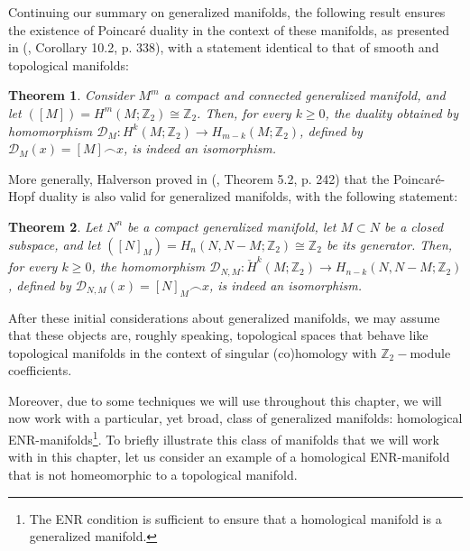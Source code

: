\documentclass[12pt,oneside]{book}
\newtheorem{teo}    {Theorem}[chapter]
\newcommand{\Z}{\mathbb{Z}}
\newcommand{\ccap}{\frown}
\begin{document}
    Continuing our summary on generalized manifolds, the following result ensures the existence of Poincaré duality in the context of these 
    manifolds, as presented in (\cite{bredon_2}, Corollary 10.2, p. 338), with a statement identical to that of smooth and topological 
    manifolds:

    \begin{teo}
        Consider $M^{m}$ a compact and connected generalized manifold, and let $([M])=H^{m}(M;\Z_{2})\cong\Z_{2}$. Then, for every $k\geq 0$, the 
        duality obtained by homomorphism $\mathcal{D}_{M}:H^{k}(M;\Z_{2})\to H_{m-k}(M;\Z_{2})$, defined by $\mathcal{D}_{M}(x)=[M]\ccap x$, is 
        indeed an isomorphism.
    \end{teo}

    More generally, Halverson proved in (\cite{halverson}, Theorem 5.2, p. 242) that the Poincaré-Hopf duality is also valid for generalized 
    manifolds, with the following statement:

    \begin{teo}
        Let $N^{n}$ be a compact generalized manifold, let $M\subset N$ be a closed subspace, and let $([N]_{M})=H_{n}(N,N-M;\Z_{2})\cong\Z_{2}$ 
        be its generator. Then, for every $k\geq 0$, the homomorphism $\mathcal{D}_{N,M}:\check{H}^{k}(M;\Z_{2})\to H_{n-k}(N,N-M;\Z_{2})$, 
        defined by $\mathcal{D}_{N,M}(x)=[N]_{M}\ccap x$, is indeed an isomorphism.
    \end{teo}

    After these initial considerations about generalized manifolds, we may assume that these objects are, roughly speaking, topological spaces 
    that behave like topological manifolds in the context of singular (co)homology with $\Z_{2}-$module coefficients.

    Moreover, due to some techniques we will use throughout this chapter, we will now work with a particular, yet broad, class of generalized 
    manifolds: homological ENR-manifolds\footnote{The ENR condition is sufficient to ensure that a homological manifold is a generalized 
    manifold.}. To briefly illustrate this class of manifolds that we will work with in this chapter, let us consider an example of a 
    homological ENR-manifold that is not homeomorphic to a topological manifold.
\end{document}

